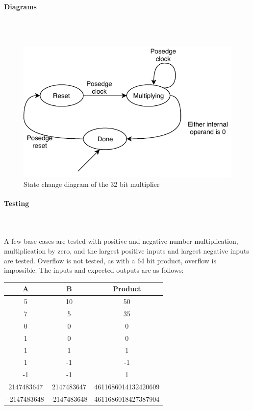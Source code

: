 \documentclass{article}
\begin{document}
    \paragraph{Diagrams}
    \hfill\\\\
    \begin{figure}[H]
        \centering
        \includegraphics{../diagrams/alu/multiplier/multiplier_32.pdf}
        \caption{State change diagram of the 32 bit multiplier}
    \end{figure}

    \paragraph{Testing}
    \hfill\\\\
    A few base cases are tested with positive and negative number
    multiplication, multiplication by zero, and the largest positive
    inputs and largest negative inputs are tested. Overflow is not tested,
    as with a 64 bit product, overflow is impossible. The inputs and expected
    outputs are as follows:

    \begin{center}
        \begin{tabular}{|c|c||c|}
            \hline
            A & B & Product
            \\\hline\hline
            5 & 10 & 50
            \\\hline
            7 & 5 & 35
            \\\hline
            0 & 0 & 0
            \\\hline
            1 & 0 & 0
            \\\hline
            1 & 1 & 1
            \\\hline
            1 & -1 & -1
            \\\hline
            -1 & -1 & 1
            \\\hline
            2147483647 & 2147483647 & 4611686014132420609
            \\\hline
            -2147483648 & -2147483648 & 4611686018427387904
            \\\hline
        \end{tabular}
    \end{center}
\end{document}
